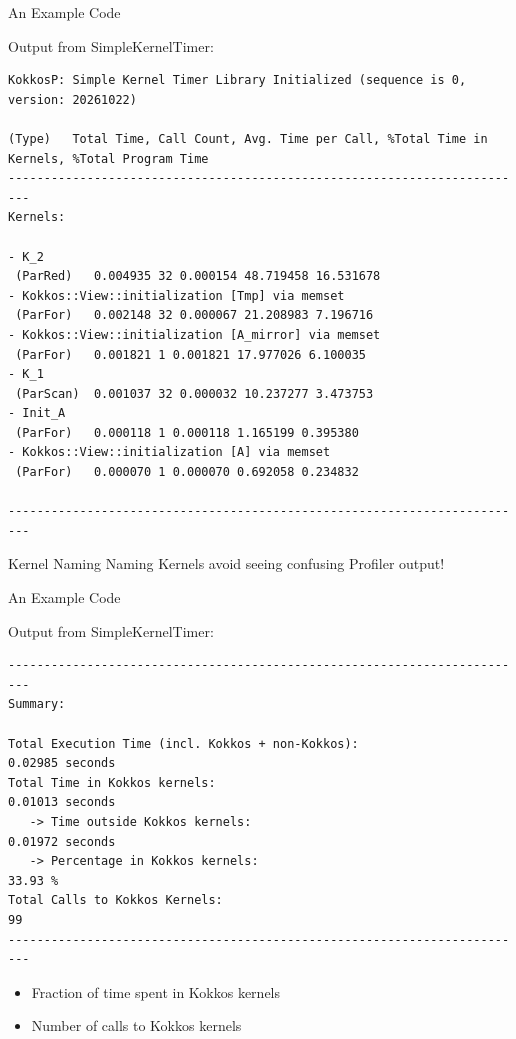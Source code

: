
\begin{frame}[fragile]{An Example Code}

Output from SimpleKernelTimer:
\begin{verbatim}
KokkosP: Simple Kernel Timer Library Initialized (sequence is 0, version: 20261022)

(Type)   Total Time, Call Count, Avg. Time per Call, %Total Time in Kernels, %Total Program Time
-------------------------------------------------------------------------
Kernels:

- K_2
 (ParRed)   0.004935 32 0.000154 48.719458 16.531678
- Kokkos::View::initialization [Tmp] via memset
 (ParFor)   0.002148 32 0.000067 21.208983 7.196716
- Kokkos::View::initialization [A_mirror] via memset
 (ParFor)   0.001821 1 0.001821 17.977026 6.100035
- K_1
 (ParScan)  0.001037 32 0.000032 10.237277 3.473753
- Init_A
 (ParFor)   0.000118 1 0.000118 1.165199 0.395380
- Kokkos::View::initialization [A] via memset
 (ParFor)   0.000070 1 0.000070 0.692058 0.234832

-------------------------------------------------------------------------
\end{verbatim}

\pause

\begin{block}{Kernel Naming}
Naming Kernels avoid seeing confusing Profiler output!
\end{block}

\end{frame}


\begin{frame}[fragile]{An Example Code}

Output from SimpleKernelTimer:
\begin{verbatim}
-------------------------------------------------------------------------
Summary:

Total Execution Time (incl. Kokkos + non-Kokkos):                   0.02985 seconds
Total Time in Kokkos kernels:                                       0.01013 seconds
   -> Time outside Kokkos kernels:                                  0.01972 seconds
   -> Percentage in Kokkos kernels:                                   33.93 %
Total Calls to Kokkos Kernels:                                           99
-------------------------------------------------------------------------
\end{verbatim}

\begin{itemize}
  \item Fraction of time spent in Kokkos kernels
  \item Number of calls to Kokkos kernels
\end{itemize}

\end{frame}

